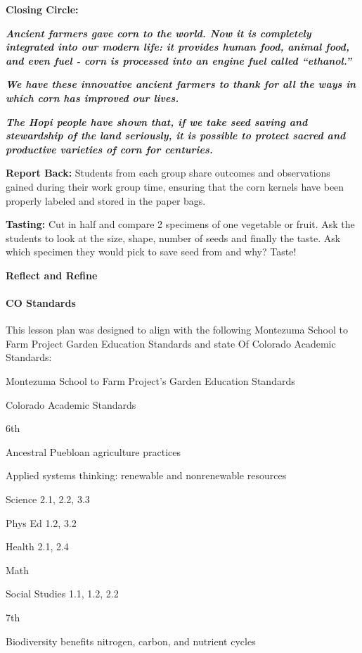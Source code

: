 \documentclass[12pt,]{article}
\let\oldparagraph\paragraph
\renewcommand{\paragraph}[1]{\oldparagraph{#1}\mbox{}}
\begin{document}
\textbf{Closing Circle: }

\textbf{\emph{Ancient farmers gave corn to the world. Now it is completely integrated into our modern life: it provides human food, animal food, and even fuel - corn is processed into an engine fuel called ``ethanol.'' }}

\textbf{\emph{We have these innovative ancient farmers to thank for all the ways in which corn has improved our lives. }}

\textbf{\emph{The Hopi people have shown that, if we take seed saving and stewardship of the land seriously, it is possible to protect sacred and productive varieties of corn for centuries.}}

\textbf{Report Back:} Students from each group share outcomes and observations gained during their work group time, ensuring that the corn kernels have been properly labeled and stored in the paper bags.

\textbf{Tasting:} Cut in half and compare 2 specimens of one vegetable or fruit. Ask the students to look at the size, shape, number of seeds and finally the taste. Ask which specimen they would pick to save seed from and why? Taste!

\textbf{Reflect and Refine}

\hypertarget{co-standards-4}{%
\paragraph{CO Standards}\label{co-standards-4}}

This lesson plan was designed to align with the following Montezuma School to Farm Project Garden Education Standards and state Of Colorado Academic Standards:

Montezuma School to Farm Project's Garden Education Standards

Colorado Academic Standards

6th

Ancestral Puebloan agriculture practices

Applied systems thinking: renewable and nonrenewable resources

Science 2.1, 2.2, 3.3

Phys Ed 1.2, 3.2

Health 2.1, 2.4

Math

Social Studies 1.1, 1.2, 2.2

7th

Biodiversity benefits nitrogen, carbon, and nutrient cycles
\end{document}
